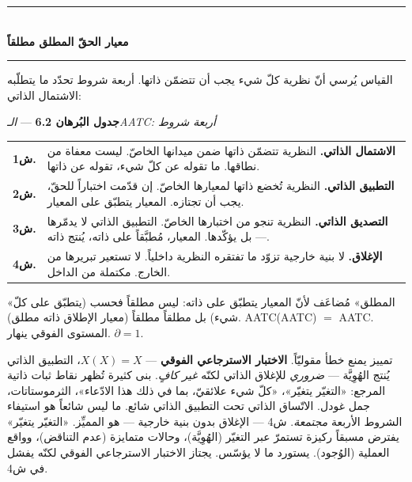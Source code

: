 \documentclass[10pt, openany, oneside]{book}
\renewcommand{\normalsize}{\fontsize{10}{13}\selectfont}
\renewcommand{\footnotesize}{\fontsize{8.5}{11}\selectfont}
\begin{document}

\begin{center}
    \rule{0.3\textwidth}{0.4pt}\\[0.5em]
    {\normalsize\bfseries معيار الحقّ المطلق مطلقاً}\\[0.3em]
    \rule{0.3\textwidth}{0.4pt}
\end{center}

\vspace{1em}

\noindent القياس يُرسي أنّ نظرية كلّ شيء يجب أن تتضمّن ذاتها. أربعة شروط تحدّد ما يتطلّبه الاشتمال الذاتي:

\vspace{0.5em}

\textbf{جدول البُرهان 6.2} --- \textit{الـAATC: أربعة شروط}

\vspace{0.5em}

{\footnotesize
\noindent\begin{tabular}{r p{}}
\textbf{ش1.} & \textbf{الاشتمال الذاتي.} النظرية تتضمّن ذاتها ضمن ميدانها الخاصّ. ليست معفاة من نطاقها. ما تقوله عن كلّ شيء، تقوله عن ذاتها. \\[0.3em]
\textbf{ش2.} & \textbf{التطبيق الذاتي.} النظرية تُخضع ذاتها لمعيارها الخاصّ. إن قدّمت اختباراً للحقّ، يجب أن تجتازه. المعيار يتطبّق على المعيار. \\[0.3em]
\textbf{ش3.} & \textbf{التصديق الذاتي.} النظرية تنجو من اختبارها الخاصّ. التطبيق الذاتي لا يدمّرها --- بل يؤكّدها. المعيار، مُطبَّقاً على ذاته، يُنتج ذاته. \\[0.3em]
\textbf{ش4.} & \textbf{الإغلاق.} لا بنية خارجية تزوّد ما تفتقره النظرية داخلياً. لا تستعير تبريرها من الخارج. مكتملة من الداخل. \\[0.3em]
\end{tabular}
}

\vspace{0.8em}

\noindent «المطلق» مُضاعَف لأنّ المعيار يتطبّق على ذاته: ليس مطلقاً فحسب (يتطبّق على كلّ شيء) بل مطلقاً مطلقاً (معيار الإطلاق ذاته مطلق). AATC(AATC) $=$ AATC. المستوى الفوقي ينهار. $\partial = 1$.

تمييز يمنع خطأ مقوليّاً. \textbf{الاختبار الاسترجاعي الفوقي} --- $X(X) = X$، التطبيق الذاتي يُنتج الهُوِيَّة --- \textit{ضروري} للإغلاق الذاتي لكنّه \textit{غير كافٍ}. بنى كثيرة تُظهر نقاط ثبات ذاتية المرجع: «التغيّر يتغيّر»، «كلّ شيء علائقيّ، بما في ذلك هذا الادّعاء»، الثرموستاتات، جمل غودل. الاتّساق الذاتي تحت التطبيق الذاتي شائع. ما ليس شائعاً هو استيفاء الشروط الأربعة \textit{مجتمعة}. ش4 --- الإغلاق بدون بنية خارجية --- هو المميِّز. «التغيّر يتغيّر» يفترض مسبقاً ركيزة تستمرّ عبر التغيّر (الهُوِيَّة)، وحالات متمايزة (عدم التناقض)، وواقع العملية (الوُجود). يستورد ما لا يؤسّس. يجتاز الاختبار الاسترجاعي الفوقي لكنّه يفشل في ش4.
\end{document}
